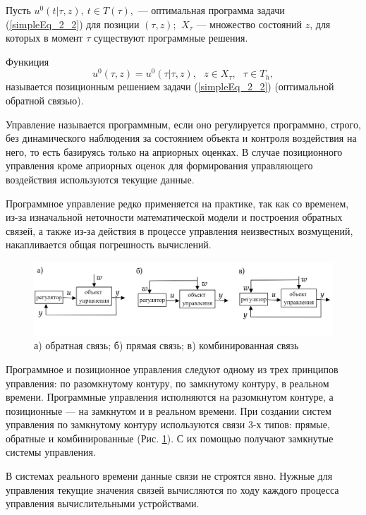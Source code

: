 Пусть $ u^0(t|\tau, z),~ t \in T(\tau), $ --- оптимальная программа задачи (\ref{simpleEq_2_2}) для позиции $(\tau, z)$; $~X_\tau$ --- множество состояний $z$, для которых в момент $\tau$ существуют программные решения.


\begin{definition}   Функиция
\[ u^0(\tau, z) = u^0(\tau|\tau, z),~~~ z \in X_\tau,~~~ \tau \in T_h,\]
называется позиционным решением задачи (\ref{simpleEq_2_2}) (оптимальной обратной связью).
\end{definition}


Управление называется программным, если оно регулируется программно, строго, без динамического наблюдения за состоянием объекта и контроля воздействия на него, то есть базируясь только на априорных оценках. В случае позиционного управления кроме априорных оценок для формирования управляющего воздействия используются текущие данные.
	
	
Программное управление редко применяется на практике, так как со временем, из-за изначальной неточности математической модели и построения обратных связей, а также из-за действия в процессе управления неизвестных возмущений, накапливается общая погрешность вычислений.

\begin{figure}[h]
	\includegraphics[width=\linewidth]{1_2_1.png}
  	\caption{а) обратная связь; б) прямая связь; в) комбинированная связь}
  	\label{fig:1_2_1}
\end{figure}

Программное и позиционное управления следуют одному из трех принципов управления: по разомкнутому контуру, по замкнутому контуру, в реальном времени. Программные управления исполняются на разомкнутом контуре, а позиционные --- на замкнутом и в реальном времени. При создании систем управления по замкнутому контуру используются связи 3-х типов: прямые, обратные и комбинированные (Рис. \ref{fig:1_2_1}). С их помощью получают замкнутые системы управления.




В системах реального времени данные связи не строятся явно. Нужные для управления текущие значения связей вычисляются по ходу каждого процесса управления вычислительными устройствами.


